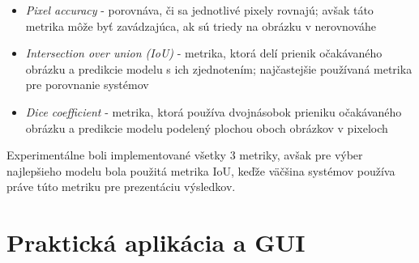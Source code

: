 \documentclass [11pt, a4paper, twocolumn]{article}
\begin{document}
\begin{itemize}
\item \textit{Pixel accuracy} - porovnáva, či sa jednotlivé pixely rovnajú; avšak táto metrika môže byť zavádzajúca, ak sú triedy na obrázku v nerovnováhe
\item \textit{Intersection over union (IoU)} - metrika, ktorá delí prienik očakávaného obrázku a predikcie modelu s ich zjednotením; najčastejšie používaná metrika pre porovnanie systémov
\item \textit{Dice coefficient} - metrika, ktorá používa dvojnásobok prieniku očakávaného obrázku a predikcie modelu podelený plochou oboch obrázkov v pixeloch 
\end{itemize}
Experimentálne boli implementované všetky 3 metriky, avšak pre výber najlepšieho modelu bola použitá metrika IoU, keďže väčšina systémov používa práve túto metriku pre prezentáciu výsledkov.

\section{Praktická aplikácia a GUI}


\renewcommand{\refname}{Použitá literatúra}

\end{document}
